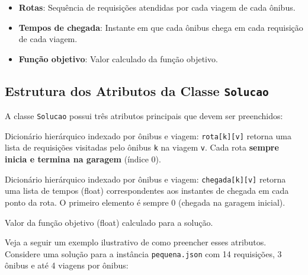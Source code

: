 \documentclass[12pt,a4paper]{article}
\begin{document}
\begin{itemize}
    \item \textbf{Rotas}: Sequência de requisições atendidas por cada viagem de cada ônibus.
    \item \textbf{Tempos de chegada}: Instante em que cada ônibus chega em cada requisição de cada viagem.
    \item \textbf{Função objetivo}: Valor calculado da função objetivo.
\end{itemize}

\subsection{Estrutura dos Atributos da Classe \texttt{Solucao}}

A classe \texttt{Solucao} possui três atributos principais que devem ser preenchidos:

\begin{description}[leftmargin=3cm,style=nextline]
    \item[\texttt{rota}] Dicionário hierárquico indexado por ônibus e viagem: \texttt{rota[k][v]} retorna uma lista de requisições visitadas pelo ônibus \texttt{k} na viagem \texttt{v}. Cada rota \textbf{sempre inicia e termina na garagem} (índice 0).
    
    \item[\texttt{chegada}] Dicionário hierárquico indexado por ônibus e viagem: \texttt{chegada[k][v]} retorna uma lista de tempos (float) correspondentes aos instantes de chegada em cada ponto da rota. O primeiro elemento é sempre 0 (chegada na garagem inicial).
    
    \item[\texttt{fx}] Valor da função objetivo (float) calculado para a solução.
\end{description}

Veja a seguir um exemplo ilustrativo de como preencher esses atributos. Considere uma solução para a instância \texttt{pequena.json} com 14 requisições, 3 ônibus e até 4 viagens por ônibus:
\end{document}

